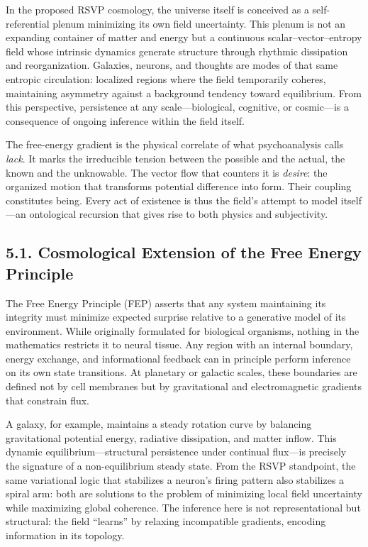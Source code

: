 \documentclass[12pt,a4paper]{article}
\begin{document}
In the proposed RSVP cosmology, the universe itself is conceived as a self-referential plenum minimizing its own field uncertainty.  
This plenum is not an expanding container of matter and energy but a continuous scalar–vector–entropy field whose intrinsic dynamics generate structure through rhythmic dissipation and reorganization.  
Galaxies, neurons, and thoughts are modes of that same entropic circulation: localized regions where the field temporarily coheres, maintaining asymmetry against a background tendency toward equilibrium.  
From this perspective, persistence at any scale—biological, cognitive, or cosmic—is a consequence of ongoing inference within the field itself.

The free-energy gradient is the physical correlate of what psychoanalysis calls \emph{lack}.  
It marks the irreducible tension between the possible and the actual, the known and the unknowable.  
The vector flow that counters it is \emph{desire}: the organized motion that transforms potential difference into form.  
Their coupling constitutes being.  
Every act of existence is thus the field’s attempt to model itself—an ontological recursion that gives rise to both physics and subjectivity.

\subsection{5.1. Cosmological Extension of the Free Energy Principle}

The Free Energy Principle (FEP) asserts that any system maintaining its integrity must minimize expected surprise relative to a generative model of its environment.  
While originally formulated for biological organisms, nothing in the mathematics restricts it to neural tissue.  
Any region with an internal boundary, energy exchange, and informational feedback can in principle perform inference on its own state transitions.  
At planetary or galactic scales, these boundaries are defined not by cell membranes but by gravitational and electromagnetic gradients that constrain flux.

A galaxy, for example, maintains a steady rotation curve by balancing gravitational potential energy, radiative dissipation, and matter inflow.  
This dynamic equilibrium—structural persistence under continual flux—is precisely the signature of a non-equilibrium steady state.  
From the RSVP standpoint, the same variational logic that stabilizes a neuron’s firing pattern also stabilizes a spiral arm: both are solutions to the problem of minimizing local field uncertainty while maximizing global coherence.  
The inference here is not representational but structural: the field “learns” by relaxing incompatible gradients, encoding information in its topology.
\end{document}
